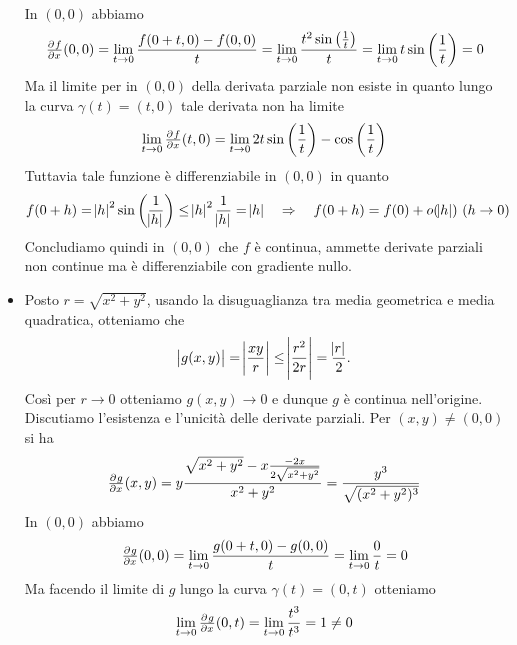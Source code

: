 \documentclass[a4paper]{article}\par \usepackage{style}\par
\begin{document}
\begin{itemize}
\begin{align*}
  \end{align*}
  In $ (0, 0) $ abbiamo
  \begin{equation*}
    \pd{f}{x}(0, 0) = \lim_{t \to 0} \frac{f(0 + t, 0) - f(0, 0)}{t} = \lim_{t \to 0} \frac{t^2 \sin{\left(\frac{1}{t}\right)}}{t} = \lim_{t \to 0} t \sin{\left(\frac{1}{t}\right)} = 0
  \end{equation*}
  Ma il limite per in $ (0, 0) $ della derivata parziale non esiste in quanto lungo la curva $ \gamma(t) = (t, 0) $ tale derivata non ha limite
  \begin{equation*}
    \lim_{t \to 0} \pd{f}{x}(t, 0) = \lim_{t \to 0} 2t \sin{\left(\frac{1}{t}\right)} - \cos{\left(\frac{1}{t}\right)}
  \end{equation*}
  Tuttavia tale funzione è differenziabile in $ (0, 0) $ in quanto
  \begin{equation*}
    f(0 + h) = \abs{h}^2 \sin{\left(\frac{1}{\abs{h}}\right)} \leq \abs{h}^2 \frac{1}{\abs{h}} = \abs{h} \quad \Rightarrow \quad f(0 + h) = f(0) + o(\abs{h}) \ (h \to 0)
  \end{equation*}
  Concludiamo quindi in $ (0, 0) $ che $ f $ è continua, ammette derivate parziali non continue ma è differenziabile con gradiente nullo.
\item Posto $ r = \sqrt{x^2 + y^2} $, usando la disuguaglianza tra media geometrica e media quadratica, otteniamo che
  \begin{equation*}
    \abs{g(x, y)} = \abs{\frac{xy}{r}} \leq \abs{\frac{r^2}{2r}} = \frac{\abs{r}}{2}.
  \end{equation*}
  Così per $ r \to 0 $ otteniamo $ g(x, y) \to 0 $ e dunque $ g $ è continua nell'origine. \\
  Discutiamo l'esistenza e l'unicità delle derivate parziali. Per $ (x, y) \neq (0, 0) $ si ha
  \begin{equation*}
    \pd{g}{x}(x, y) = y \frac{\sqrt{x^2 + y^2} - x \frac{- 2x}{2 \sqrt{x^2 + y^2}}}{x^2 + y^2} = \frac{y^3}{\sqrt{(x^2 + y^2)^3}}
  \end{equation*}
  In $ (0, 0) $ abbiamo
  \begin{equation*}
    \pd{g}{x}(0, 0) = \lim_{t \to 0} \frac{g(0 + t, 0) - g(0, 0)}{t} = \lim_{t \to 0} \frac{0}{t} = 0
  \end{equation*}
  Ma facendo il limite di $ g $ lungo la curva $ \gamma(t) = (0, t) $ otteniamo
  \begin{equation*}
    \lim_{t \to 0} \pd{g}{x}(0, t) = \lim_{t \to 0} \frac{t^3}{t^3} = 1 \neq 0
  \end{equation*}

\end{itemize}
\end{document}
